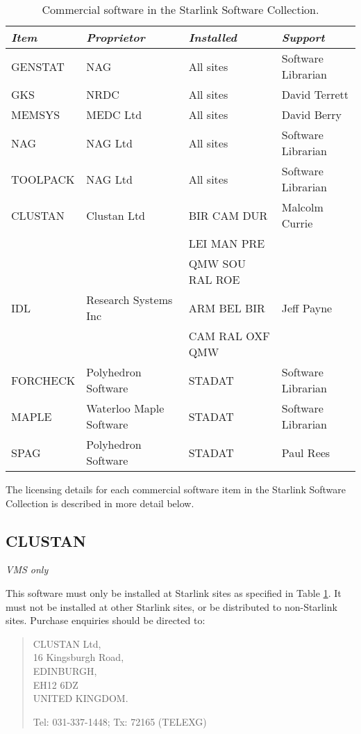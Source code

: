 \begin{table}[h]
\begin{center}
\begin{tabular}{||l|l|l|l||} \hline
{\em Item} & {\em Proprietor} & {\em Installed} & {\em Support} \\ \hline \hline
GENSTAT   & NAG      & All sites & Software Librarian\\
GKS       & NRDC     & All sites & David Terrett \\
MEMSYS    & MEDC Ltd & All sites & David Berry \\
NAG       & NAG Ltd  & All sites & Software Librarian \\
TOOLPACK  & NAG Ltd  & All sites & Software Librarian \\ \hline
CLUSTAN   & Clustan Ltd & BIR CAM DUR & Malcolm Currie \\
          &             & LEI MAN PRE & \\
          &             & QMW SOU RAL ROE & \\
IDL       & Research Systems Inc & ARM BEL BIR & Jeff Payne \\
          &             & CAM RAL OXF QMW & \\ \hline
FORCHECK  & Polyhedron Software & STADAT & Software Librarian \\
MAPLE     & Waterloo Maple Software & STADAT & Software Librarian\\
SPAG      & Polyhedron Software & STADAT & Paul Rees \\ \hline
\end{tabular}
\caption{Commercial software in the Starlink Software Collection.}
\label{tab:comm}
\end{center}
\end{table}

The licensing details for each commercial software item in the Starlink
Software Collection is described in more detail below.

\subsection {CLUSTAN}

{\em VMS only}

This software must only be installed at Starlink sites as specified in Table 
\ref{tab:comm}.
It must not be installed at other Starlink sites, or be distributed to
non-Starlink sites.
Purchase enquiries should be directed to:

\begin{verse}
CLUSTAN Ltd,\\
16 Kingsburgh Road,\\
EDINBURGH,\\
EH12 6DZ\\
UNITED KINGDOM.

Tel: 031-337-1448; \hspace{10mm} Tx: 72165 (TELEXG)
\end{verse}

